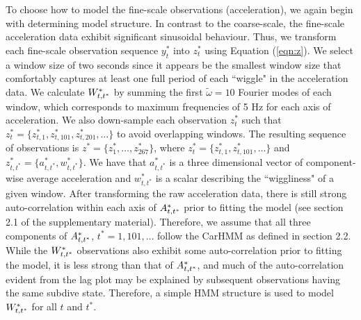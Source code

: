 To choose how to model the fine-scale observations (acceleration), we again begin with determining model structure. In contrast to the coarse-scale, the fine-scale acceleration data exhibit significant sinusoidal behaviour. Thus, we transform each fine-scale observation sequence $y_t^*$ into $z_t^*$ using Equation (\ref{eqn:z}). We select a window size of two seconds since it appears be the smallest window size that comfortably captures at least one full period of each ``wiggle" in the acceleration data.
%
We calculate $W^*_{t,t^*}$ by summing the first $\tilde \omega = 10$ Fourier modes of each window, which corresponds to maximum frequencies of 5 Hz for each axis of acceleration. We also down-sample each observation $z^*_t$ such that $z^*_t = \Big\{z^*_{t,1},z^*_{t,101},z^*_{t,201},\ldots\Big\}$ to avoid overlapping windows. The resulting sequence of observations is $z^* = \Big\{z^*_1,\ldots,z^*_{267}\Big\}$, where $z^*_t = \Big\{z^*_{t,1},z^*_{t,101},\ldots\Big\}$ and $z^*_{t,t^*} = \{a^*_{t,t^*},w^*_{t,t^*}\}$. We have that $a^*_{t,t^*}$ is a three dimensional vector of component-wise average acceleration and $w^*_{t,t^*}$ is a scalar describing the ``wiggliness" of a given window.
%
After transforming the raw acceleration data, there is still strong auto-correlation within each axis of $A^*_{t,t^*}$ prior to fitting the model (see section 2.1 of the supplementary material). Therefore, we assume that all three components of $A^*_{t,t^*}$, $t^* = 1,101,\ldots$ follow the CarHMM as defined in section 2.2. 
%
%
While the $W^*_{t,t^*}$ observations also exhibit some auto-correlation prior to fitting the model, it is less strong than that of $A^*_{t,t^*}$, and 
much of the auto-correlation evident from the lag plot may be explained by subsequent observations having the same subdive state. Therefore, a simple HMM structure is used to model $W^*_{t,t^*}$ for all $t$ and $t^*$. 
%
%

